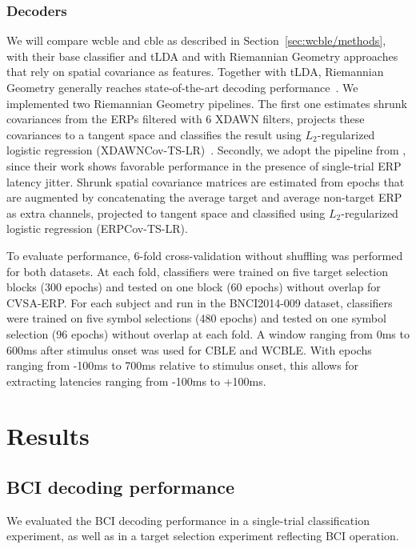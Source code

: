 \subsubsection{Decoders}
We will compare \ac{wcble} and \ac{cble} as described in
Section~\ref{sec:wcble/methods}, with their base classifier and tLDA and with
Riemannian Geometry
approaches that rely on spatial covariance as features.
Together with tLDA, Riemannian Geometry generally reaches state-of-the-art decoding
performance~\cite{Lotte2018}.
We implemented two Riemannian Geometry pipelines.
The first one estimates shrunk covariances from the ERPs filtered with 6 XDAWN
filters, projects these covariances to a tangent space and classifies the
result using $L_2$-regularized logistic regression
(XDAWNCov-TS-LR)~\cite{Cecotti2017}.
Secondly, we adopt the pipeline from \cite{Aydarkhanov2020}, since their work shows
favorable performance in the presence of single-trial ERP latency jitter.
Shrunk spatial covariance matrices are estimated from epochs that are
augmented by concatenating the average target and average non-target ERP as
extra channels, projected to tangent space and classified using
$L_2$-regularized logistic regression (ERPCov-TS-LR).

To evaluate performance, 6-fold cross-validation without shuffling was performed for both
datasets.
At each fold, classifiers were trained on five target selection blocks (300
epochs) and tested on one block (60 epochs) without overlap for CVSA-ERP.
For each subject and run in the BNCI2014-009 dataset, classifiers
were trained on five symbol selections (480 epochs) and tested on one symbol
selection (96 epochs) without overlap at each fold.
A window ranging from 0ms to 600ms after stimulus onset was used for CBLE and WCBLE.
With epochs ranging from -100ms to 700ms relative to stimulus onset, this
allows for extracting latencies ranging from -100ms to +100ms.



\section{Results}

\subsection{BCI decoding performance}
\label{sec:block_accuracy}

We evaluated the BCI decoding performance in a single-trial classification
experiment, as well as in a target selection experiment reflecting BCI
operation.

